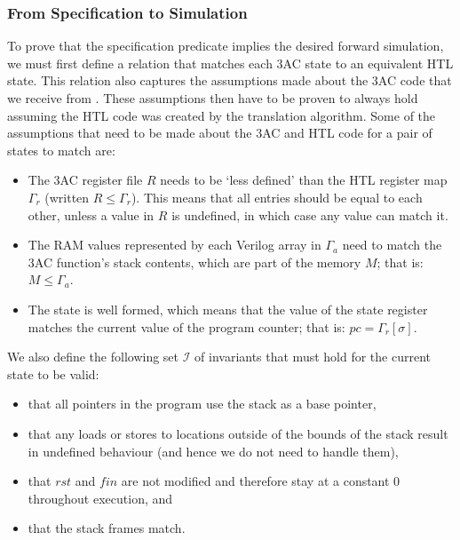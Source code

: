 \subsubsection{From Specification to Simulation}

To prove that the specification predicate implies the desired forward
simulation, we must first define a relation that matches each 3AC state to an
equivalent HTL state.  This relation also captures the assumptions made about
the 3AC code that we receive from
\compcert{}. %
These assumptions then have to be proven to always hold assuming the HTL code
was created by the translation algorithm.  Some of the assumptions that need to
be made about the 3AC and HTL code for a pair of states to match are:

\begin{itemize}
\item The 3AC register file $R$ needs to be `less defined' than the HTL register
  map $\Gamma_{r}$ (written $R \le \Gamma_{r}$). This means that all entries
  should be equal to each other, unless a value in $R$ is undefined, in which
  case any value can match it.
\item The RAM values represented by each Verilog array in $\Gamma_{a}$ need to
  match the 3AC function's stack contents, which are part of the memory $M$;
  that is: $M \le \Gamma_{a}$.
\item The state is well formed, which means that the value of the state register
  matches the current value of the program counter; that is:
  $\mathit{pc} = \Gamma_{r}[\sigma]$.
\end{itemize}

We also define the following set $\mathcal{I}$ of invariants that must hold for
the current state to be valid:

\begin{itemize}
\item that all pointers in the program use the stack as a base pointer,
\item that any loads or stores to locations outside of the bounds of the stack
  result in undefined behaviour (and hence we do not need to handle them),
\item that $\mathit{rst}$ and $\mathit{fin}$ are not modified and therefore stay
  at a constant 0 throughout execution, and
\item that the stack frames match.
\end{itemize}

